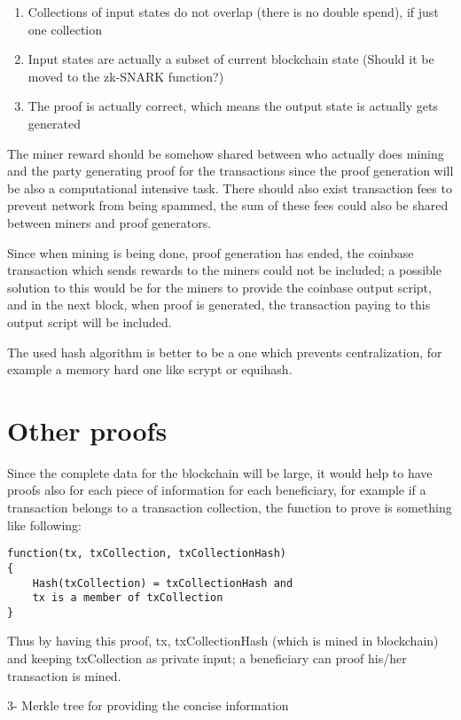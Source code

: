\documentclass{article}
\begin{document}
\begin{enumerate}
\item Collections of input states do not overlap (there is no double spend), if just one collection 
\item Input states are actually a subset of current blockchain state (Should it be moved to the zk-SNARK function?)
\item The proof is actually correct, which means the output state is actually gets generated
\end{enumerate}

The miner reward should be somehow shared between who actually does mining and the party generating proof for the transactions since the proof generation will be also a computational intensive task.
There should also exist transaction fees to prevent network from being spammed, the sum of these fees could also be shared between miners and proof generators.

Since when mining is being done, proof generation has ended, the coinbase transaction which sends rewards to the miners could not be included; a possible solution to this would be for the miners to provide the coinbase output script, and in the next block, when proof is generated, the transaction paying to this output script will be included.

The used hash algorithm is better to be a one which prevents centralization, for example a memory hard one like scrypt or equihash.

\section{Other proofs}

Since the complete data for the blockchain will be large, it would help to have proofs also for each piece of information for each beneficiary, for example if a transaction belongs to a transaction collection, the function to prove is something like following:

\begin{verbatim}
function(tx, txCollection, txCollectionHash)
{
	Hash(txCollection) = txCollectionHash and
	tx is a member of txCollection 
}
\end{verbatim}

Thus by having this proof, tx, txCollectionHash (which is mined in blockchain) and keeping txCollection as private input; a beneficiary can proof his/her transaction is mined.

3- Merkle tree for providing the concise information
\end{document}
